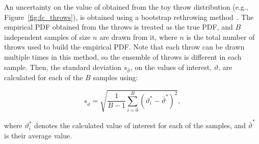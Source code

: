 An uncertainty on the value of \dchisqcrit obtained from the toy throw distribution (e.g., Figure~\ref{fig:fc_throws}), is obtained using a bootstrap rethrowing method~\cite{rice2006mathematical}. The empirical PDF obtained from the throws is treated as the true PDF, and $B$ independent samples of size $n$ are drawn from it, where $n$ is the total number of throws used to build the empirical PDF. Note that each throw can be drawn multiple times in this method, so the ensemble of throws is different in each sample. Then, the standard deviation $s_{\hat{\vartheta}}$, on the \dchisqcrit values of interest, $\vartheta$, are calculated for each of the $B$ samples using:
\begin{linenomath*}
\begin{equation}
  s_{\hat{\vartheta}} = \sqrt{\frac{1}{B-1} \sum^{B}_{i=0} (\vartheta_{i}^{*} - \bar{\vartheta}^{*})^{2}},
  \label{eq:fc_uncertainty}
\end{equation}
\end{linenomath*}
where $\vartheta_{i}^{*}$ denotes the calculated \dchisqcrit value of interest for each of the samples, and $\bar{\vartheta}^{*}$ is their average value.

